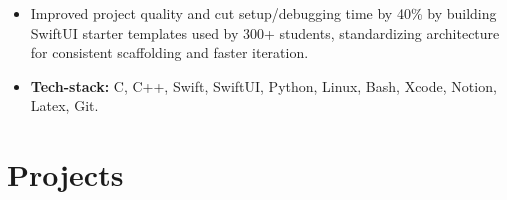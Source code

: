 \documentclass[a4paper, 10pt]{article}
\begin{document}
\begin{itemize}[itemsep=1pt,leftmargin=0in, label={}]
\begin{itemize}[itemsep=1pt]
            \item Improved project quality and cut setup/debugging time by 40\% by building SwiftUI starter templates used by 300+ students, standardizing architecture for consistent scaffolding and faster iteration.
            
            \item \textbf{Tech-stack:} C, C++, Swift, SwiftUI, Python, Linux, Bash, Xcode, Notion, Latex, Git.
        \end{itemize}
  \end{itemize}

\vspace{-15pt}
\section{Projects}
    \vspace{-5pt}
\end{document}
